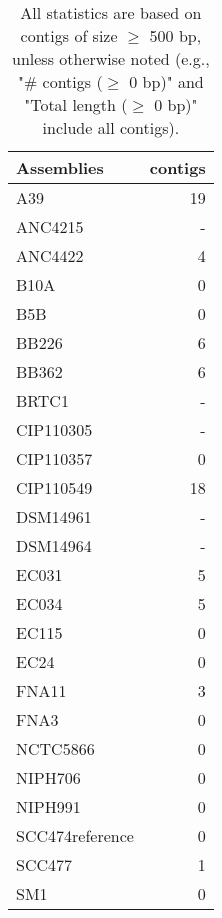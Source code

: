 \documentclass[12pt,a4paper]{article}
\begin{document}
\begin{table}[ht]
\begin{center}
\caption{All statistics are based on contigs of size $\geq$ 500 bp, unless otherwise noted (e.g., "\# contigs ($\geq$ 0 bp)" and "Total length ($\geq$ 0 bp)" include all contigs).}
\begin{tabular}{|l*{1}{|r}|}
\hline
Assemblies & contigs \\ \hline
A39 & 19 \\ \hline
ANC4215 & - \\ \hline
ANC4422 & 4 \\ \hline
B10A & 0 \\ \hline
B5B & 0 \\ \hline
BB226 & 6 \\ \hline
BB362 & 6 \\ \hline
BRTC1 & - \\ \hline
CIP110305 & - \\ \hline
CIP110357 & 0 \\ \hline
CIP110549 & 18 \\ \hline
DSM14961 & - \\ \hline
DSM14964 & - \\ \hline
EC031 & 5 \\ \hline
EC034 & 5 \\ \hline
EC115 & 0 \\ \hline
EC24 & 0 \\ \hline
FNA11 & 3 \\ \hline
FNA3 & 0 \\ \hline
NCTC5866 & 0 \\ \hline
NIPH706 & 0 \\ \hline
NIPH991 & 0 \\ \hline
SCC474reference & 0 \\ \hline
SCC477 & 1 \\ \hline
SM1 & 0 \\ \hline
\end{tabular}
\end{center}
\end{table}
\end{document}
